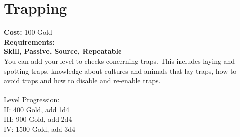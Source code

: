 \section*{Trapping}
\textbf{Cost:} 100 Gold\\
\textbf{Requirements:} -\\
\textbf{Skill, Passive, Source, Repeatable}\\
You can add your level to checks concerning traps. This includes laying and spotting traps, knowledge about cultures and animals that lay traps, how to avoid traps and how to disable and re-enable traps.\\
\\
Level Progression:\\
II: 400 Gold, add 1d4\\
III: 900 Gold, add 2d4\\
IV: 1500 Gold, add 3d4\\
